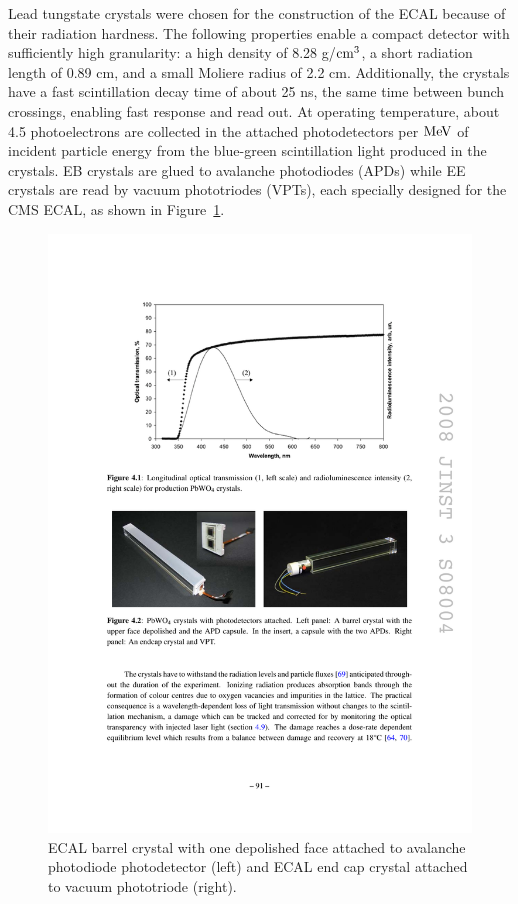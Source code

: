 \indent Lead tungstate crystals were chosen for the construction of the ECAL because of their radiation hardness. The following properties enable a compact detector with sufficiently high granularity: a high density of 8.28 g/$\rm{cm}^3$, a short radiation length of 0.89 cm, and a small Moliere radius of 2.2 cm. Additionally, the crystals have a fast scintillation decay time of about 25 ns, the same time between bunch crossings, enabling fast response and read out. At operating temperature, about 4.5 photoelectrons are collected in the attached photodetectors per $\mathrm{Me\kern -0.1em V}$ of incident particle energy from the blue-green scintillation light produced in the crystals. EB crystals are glued to avalanche photodiodes (APDs) while EE crystals are read by vacuum phototriodes (VPTs), each specially designed for the CMS ECAL, as shown in Figure~\ref{fig:crystalmodules}. 

\begin{figure}[tbh]
\centering
\includegraphics[width=6in]{figures/crystalmodules.pdf}
\caption{ECAL barrel crystal with one depolished face attached to avalanche photodiode photodetector (left) and ECAL end cap crystal attached to vacuum phototriode (right).}
\label{fig:crystalmodules}
\end{figure}

